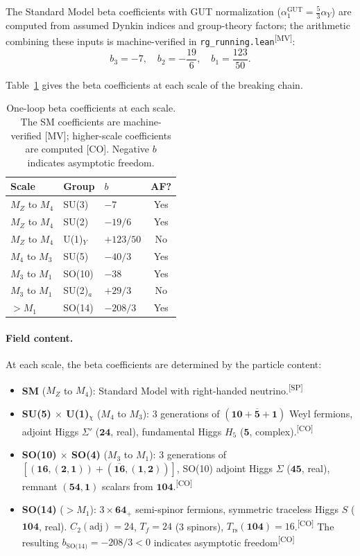 \documentclass[aps,prd,twocolumn,showpacs,preprintnumbers,superscriptaddress,floatfix]{revtex4-2}
\newcommand{\MV}{\textsuperscript{[MV]}}
\newcommand{\CO}{\textsuperscript{[CO]}}
\newcommand{\SP}{\textsuperscript{[SP]}}
\begin{document}
The Standard Model beta coefficients with GUT normalization
($\alpha_1^\text{GUT} = \frac{5}{3} \alpha_Y$) are computed from assumed Dynkin indices and group-theory factors; the arithmetic combining these inputs is machine-verified in
\texttt{rg\_running.lean}\MV:
\begin{equation}\label{eq:sm-betas}
  b_3 = -7, \quad b_2 = -\frac{19}{6}, \quad
  b_1 = \frac{123}{50}.
\end{equation}

Table~\ref{tab:betas} gives the beta coefficients at each scale
of the breaking chain.

\begin{table}[b]
\centering
\caption{One-loop beta coefficients at each scale.  The SM coefficients
  are machine-verified [MV]; higher-scale coefficients are computed [CO].
  Negative $b$ indicates asymptotic freedom.}
\label{tab:betas}
\small
\begin{tabular}{@{}lllc@{}}
\toprule
\textbf{Scale} & \textbf{Group} & $b$ & \textbf{AF?} \\
\midrule
$M_Z$ to $M_4$ & SU(3) & $-7$ & Yes \\
$M_Z$ to $M_4$ & SU(2) & $-19/6$ & Yes \\
$M_Z$ to $M_4$ & U(1)$_Y$ & $+123/50$ & No \\
$M_4$ to $M_3$ & SU(5) & $-40/3$ & Yes \\
$M_3$ to $M_1$ & SO(10) & $-38$ & Yes \\
$M_3$ to $M_1$ & SU(2)$_a$ & $+29/3$ & No \\
$> M_1$ & SO(14) & $-208/3$ & Yes \\
\bottomrule
\end{tabular}
\end{table}

\paragraph{Field content.}
At each scale, the beta coefficients are determined by the particle
content:
\begin{itemize}
\item \textbf{SM} ($M_Z$ to $M_4$): Standard Model with right-handed
  neutrino.\SP
\item \textbf{SU(5) $\times$ U(1)$_\chi$} ($M_4$ to $M_3$): 3
  generations of $(\mathbf{10} + \overline{\mathbf{5}} + \mathbf{1})$
  Weyl fermions, adjoint Higgs $\Sigma'$ ($\mathbf{24}$, real),
  fundamental Higgs $H_5$ ($\mathbf{5}$, complex).\CO
\item \textbf{SO(10) $\times$ SO(4)} ($M_3$ to $M_1$): 3 generations
  of $[(\mathbf{16}, (\mathbf{2}, \mathbf{1})) + (\overline{\mathbf{16}},
  (\mathbf{1}, \mathbf{2}))]$, SO(10) adjoint Higgs $\Sigma$
  ($\mathbf{45}$, real), remnant $(\mathbf{54}, \mathbf{1})$ scalars
  from $\mathbf{104}$.\CO
\item \textbf{SO(14)} ($> M_1$): $3 \times \mathbf{64}_+$
  semi-spinor fermions, symmetric traceless Higgs $S$ ($\mathbf{104}$,
  real).  $C_2(\text{adj}) = 24$, $T_f = 24$ (3 spinors),
  $T_\text{rs}(\mathbf{104}) = 16$.\CO{}  The resulting
  $b_\text{SO(14)} = -208/3 < 0$ indicates asymptotic freedom\CO
\end{itemize}
\end{document}

